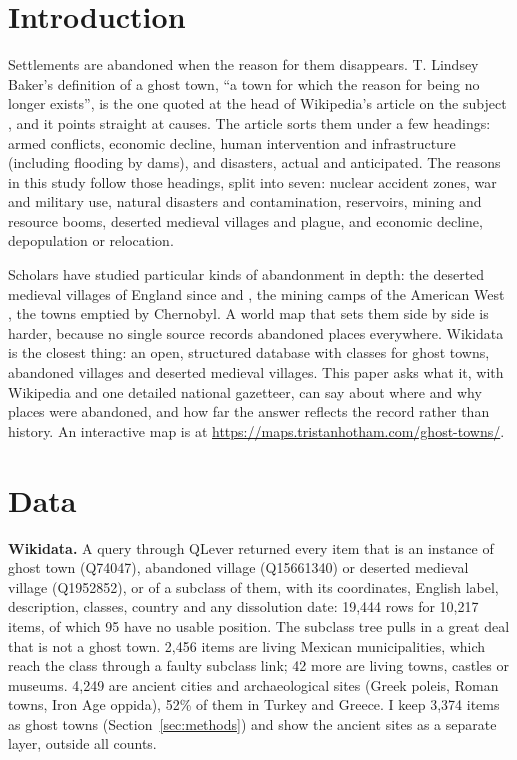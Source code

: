 \documentclass[11pt,a4paper]{article}
\begin{document}
\section{Introduction}
Settlements are abandoned when the reason for them disappears. T. Lindsey Baker's definition of a ghost town, ``a town for which the reason for being no longer exists'', is the one quoted at the head of Wikipedia's article on the subject \citep{wikighost}, and it points straight at causes. The article sorts them under a few headings: armed conflicts, economic decline, human intervention and infrastructure (including flooding by dams), and disasters, actual and anticipated. The reasons in this study follow those headings, split into seven: nuclear accident zones, war and military use, natural disasters and contamination, reservoirs, mining and resource booms, deserted medieval villages and plague, and economic decline, depopulation or relocation.

Scholars have studied particular kinds of abandonment in depth: the deserted medieval villages of England since \citet{beresford1954} and \citet{beresfordhurst1971}, the mining camps of the American West \citep{paul1963}, the towns emptied by Chernobyl. A world map that sets them side by side is harder, because no single source records abandoned places everywhere. Wikidata is the closest thing: an open, structured database with classes for ghost towns, abandoned villages and deserted medieval villages. This paper asks what it, with Wikipedia and one detailed national gazetteer, can say about where and why places were abandoned, and how far the answer reflects the record rather than history. An interactive map is at \url{https://maps.tristanhotham.com/ghost-towns/}.

\section{Data}
\textbf{Wikidata.} A query through QLever returned every item that is an instance of ghost town (Q74047), abandoned village (Q15661340) or deserted medieval village (Q1952852), or of a subclass of them, with its coordinates, English label, description, classes, country and any dissolution date: 19,444 rows for 10,217 items, of which 95 have no usable position. The subclass tree pulls in a great deal that is not a ghost town. 2,456 items are living Mexican municipalities, which reach the class through a faulty subclass link; 42 more are living towns, castles or museums. 4,249 are ancient cities and archaeological sites (Greek poleis, Roman towns, Iron Age oppida), 52\% of them in Turkey and Greece. I keep 3,374 items as ghost towns (Section~\ref{sec:methods}) and show the ancient sites as a separate layer, outside all counts.
\end{document}
